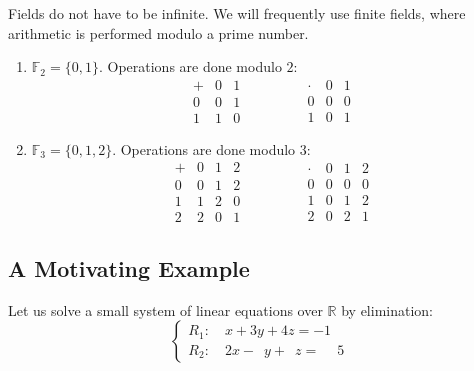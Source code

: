 \begin{example}
Fields do not have to be infinite. We will frequently use finite fields, where arithmetic is performed modulo a prime number.
\begin{enumerate}
    \item $\mathbb{F}_2 = \{0, 1\}$. Operations are done modulo $2$:
    \[
    \begin{array}{c|cc}
    + & 0 & 1 \\
    \hline
    0 & 0 & 1 \\
    1 & 1 & 0
    \end{array}
    \qquad\qquad
    \begin{array}{c|cc}
    \cdot & 0 & 1 \\
    \hline
    0 & 0 & 0 \\
    1 & 0 & 1
    \end{array}
    \]
    \item $\mathbb{F}_3 = \{0, 1, 2\}$. Operations are done modulo $3$:
    \[
    \begin{array}{c|ccc}
    + & 0 & 1 & 2 \\
    \hline
    0 & 0 & 1 & 2 \\
    1 & 1 & 2 & 0 \\
    2 & 2 & 0 & 1
    \end{array}
    \qquad\qquad
    \begin{array}{c|ccc}
    \cdot & 0 & 1 & 2 \\
    \hline
    0 & 0 & 0 & 0 \\
    1 & 0 & 1 & 2 \\
    2 & 0 & 2 & 1
    \end{array}
    \]
\end{enumerate}
\end{example}

\subsection{A Motivating Example}

Let us solve a small system of linear equations over $\mathbb{R}$ by elimination:
\begin{equation*}
\begin{cases}
R_1: \quad x + 3y + 4z = -1 \\
R_2: \quad 2x - \phantom{3}y + \phantom{4}z = \phantom{-}5
\end{cases}
\end{equation*}

